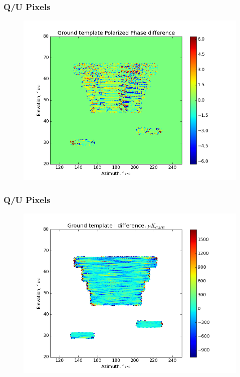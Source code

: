 \documentclass{beamer}
\begin{document}
\begin{frame}
\frametitle{Q/U Pixels}
\begin{figure}
\includegraphics[width=0.9\linewidth]{dArg_gt_QU_PIXEL.png}
\end{figure}
\end{frame}

\begin{frame}
\frametitle{Q/U Pixels}
\begin{figure}
\includegraphics[width=0.9\linewidth]{dI_gt_QU_PIXEL.png}
\end{figure}
\end{frame}
\end{document}
